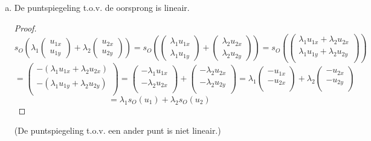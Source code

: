 \documentclass[lineaire_algebra_oplossingen.tex]{subfiles}
\begin{document}
\begin{enumerate}
\begin{enumerate}[a)]
\item De puntspiegeling t.o.v. de oorsprong is lineair.
\begin{proof}
\[
s_O \left(\lambda_1
\begin{pmatrix}
u_{1x}\\u_{1y}
\end{pmatrix} 
+ \lambda_2
\begin{pmatrix}
u_{2x}\\u_{2y}
\end{pmatrix} \right)
 = 
s_O \left(
\begin{pmatrix}
\lambda_1u_{1x}\\\lambda_1u_{1y}
\end{pmatrix} 
+ 
\begin{pmatrix}
\lambda_2u_{2x}\\\lambda_2u_{2y}
\end{pmatrix} \right)
=
s_O \left(
\begin{pmatrix}
\lambda_1u_{1x}+\lambda_2u_{2x}\\\lambda_1u_{1y}+\lambda_2u_{2y}\\
\end{pmatrix} \right)
\]
\[
= 
\begin{pmatrix}
-(\lambda_1u_{1x}+\lambda_2u_{2x})\\-(\lambda_1u_{1y}+\lambda_2u_{2y})\\
\end{pmatrix} 
=
\begin{pmatrix}
-\lambda_1u_{1x}\\-\lambda_2u_{2x}\\
\end{pmatrix}
+
\begin{pmatrix}
-\lambda_2u_{2x}\\-\lambda_2u_{2y}\\
\end{pmatrix}
=
\lambda_1
\begin{pmatrix}
-u_{1x}\\-u_{2x}\\
\end{pmatrix}
+
\lambda_2
\begin{pmatrix}
-u_{2x}\\-u_{2y}\\
\end{pmatrix}
\]
\[
=
\lambda_1s_O(u_1) + \lambda_2s_O(u_2)
\]
\end{proof}
(De puntspiegeling t.o.v. een ander punt is niet lineair.)


\end{enumerate}
\end{enumerate}
\end{document}
